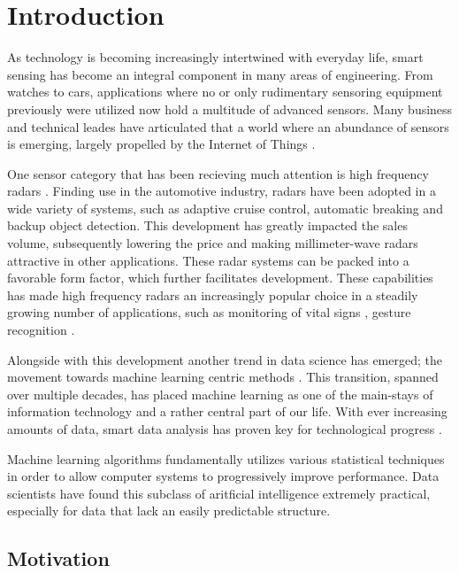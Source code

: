 \chapter{Introduction}

As technology is becoming increasingly intertwined with everyday life, smart sensing has become an integral component in many areas of engineering. From watches to cars, applications where no or only rudimentary sensoring equipment previously were utilized now hold a multitude of advanced sensors. Many business and technical leades have articulated that a world where an abundance of sensors is emerging, largely propelled by the Internet of Things \citep{bryzek_2013}. 

One sensor category that has been recieving much attention is high frequency radars \citep{frenzel_2018}. Finding use in the automotive industry, radars have been adopted in a wide variety of systems, such as adaptive cruise control, automatic breaking and backup object detection. This development has greatly impacted the sales volume, subsequently lowering the price and making millimeter-wave radars attractive in other applications. These radar systems can be packed into a favorable form factor, which further facilitates development. These capabilities has made high frequency radars an increasingly popular choice in a steadily growing number of applications, such as monitoring of vital signs \citep{kuo_lin_yu_lo_lyu_chou_chuang_2016}, gesture recognition \citep{lien_gillian_karagozler_amihood_schwesig_olson_raja_poupyrev_2016}.

Alongside with this development another trend in data science has emerged; the movement towards machine learning centric methods . This transition, spanned over multiple decades, has placed machine learning as one of the main-stays of information technology and a rather central part of our life. With ever increasing amounts of data, smart data analysis has proven key for technological progress \citep{a_smola_svn_vishwanathan_2010}.

Machine learning algorithms fundamentally utilizes various statistical techniques in order to allow computer systems to progressively improve performance. Data scientists have found this subclass of aritficial intelligence extremely practical, especially for data that lack an easily predictable structure. 

\section{Motivation}

